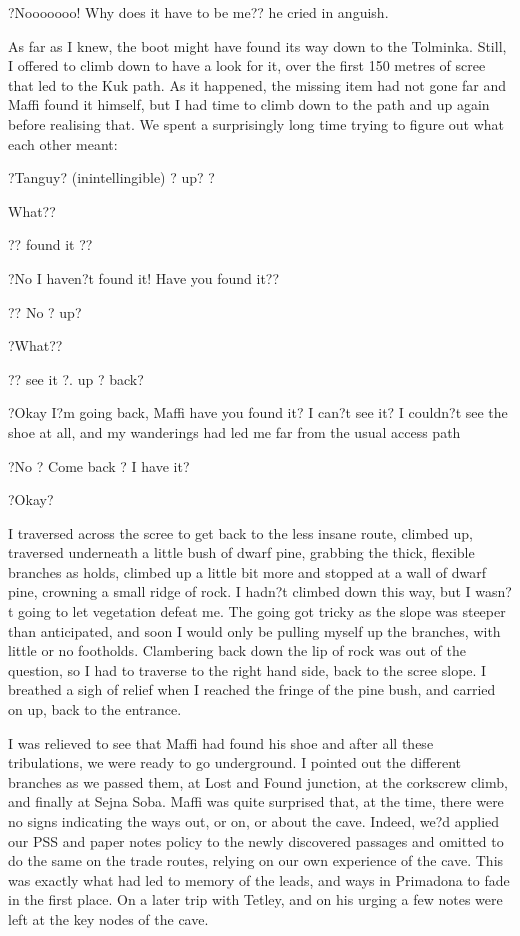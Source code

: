 \documentclass[onecolumn]{book}
\begin{document}
?Nooooooo! Why does it have to be me?? he cried in anguish. 

As far as I knew, the boot might have found its way down to the Tolminka. Still, I offered to climb down to have a look for it, over the first 150 metres of scree that led to the Kuk path. As it happened, the missing item had not gone far and Maffi found it himself, but I had time to climb down to the path and up again before realising that. We spent a surprisingly long time trying to figure out what each other meant: 

?Tanguy? (inintellingible) ?  up? ?

What?? 

?? found it ?? 

?No I haven?t found it! Have you found it?? 

 ?? No ? up?  
 
?What?? 

?? see it ?. up ? back? 

?Okay I?m going back, Maffi have you found it? I can?t see it?  I couldn?t see the shoe at all, and my wanderings had led me far from the usual access path

?No ? Come back ? I have it?

?Okay?

I traversed across the scree to get back to the less insane route, climbed up, traversed underneath a little bush of dwarf pine, grabbing the thick, flexible branches as holds, climbed up a little bit more and stopped at a wall of dwarf pine, crowning a small ridge of rock. I hadn?t climbed down this way, but I wasn?t going to let vegetation defeat me. The going got tricky as the slope was steeper than anticipated, and soon I would only be pulling myself up the branches, with little or no footholds. Clambering back down the lip of rock was out of the question, so I had to traverse to the right  hand side, back to the scree slope. I breathed a sigh of relief when I reached the fringe of the pine bush, and carried on up, back to the entrance. 

I was relieved to see that Maffi had found his shoe and after all these tribulations, we were ready to go underground. I pointed out the different branches as we passed them, at Lost and Found junction, at the corkscrew climb, and finally at Sejna Soba. Maffi was quite surprised that, at the time, there were no signs indicating the ways out, or on, or about the cave. Indeed, we?d applied our PSS and paper notes policy to the newly discovered passages and omitted to do the same on the trade routes, relying on our own experience of the cave. This was exactly what had led to memory of the leads, and ways in Primadona to fade in the first place. On a later trip with Tetley, and on his urging a few notes were left at the key nodes of the cave.
\end{document}
